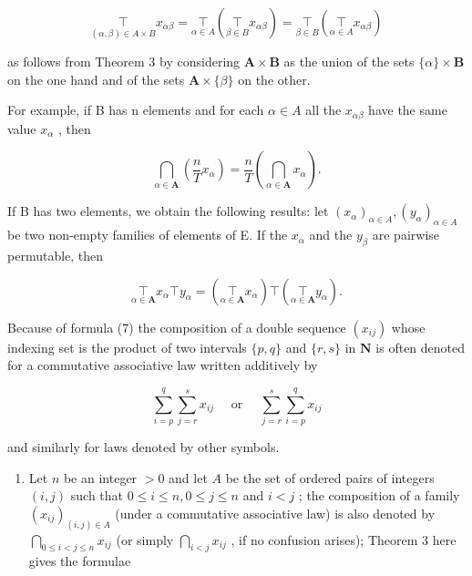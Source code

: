 \[
\underset {(\alpha , \beta) \in A \times B} {\top} x _ {\alpha \beta} = \underset {\alpha \in A} {\top} \left(\underset {\beta \in B} {\top} x _ {\alpha \beta}\right) = \underset {\beta \in B} {\top} \left(\underset {\alpha \in A} {\top} x _ {\alpha \beta}\right)\tag{7}
\]

as follows from Theorem 3 by considering \(\mathbf{A} \times \mathbf{B}\) as the union of the sets \(\{\alpha\} \times \mathbf{B}\) on the one hand and of the sets \(\mathbf{A} \times \{\beta\}\) on the other.

For example, if B has n elements and for each \(\alpha \in A\) all the \(x_{\alpha\beta}\) have the same value \(x_{\alpha}\) , then

\[
\bigcap_ {\alpha \in \mathbf {A}} \left(\frac {n}{T} x _ {\alpha}\right) = \frac {n}{T} \left(\bigcap_ {\alpha \in \mathbf {A}} x _ {\alpha}\right).\tag{8}
\]

If B has two elements, we obtain the following results: let \((x_{\alpha})_{\alpha \in A}, (y_{\alpha})_{\alpha \in A}\) be two non-empty families of elements of E. If the \(x_{\alpha}\) and the \(y_{\beta}\) are pairwise permutable, then

\[
\underset {\alpha \in \mathbf {A}} {\top} x _ {\alpha} \top y _ {\alpha} = \left(\underset {\alpha \in \mathbf {A}} {\top} x _ {\alpha}\right) \top \left(\underset {\alpha \in \mathbf {A}} {\top} y _ {\alpha}\right).\tag{9}
\]

Because of formula (7) the composition of a double sequence \((x_{ij})\) whose indexing set is the product of two intervals \(\{p, q\}\) and \(\{r, s\}\) in \(\mathbf{N}\) is often denoted for a commutative associative law written additively by

\[
\sum_ {i = p} ^ {q} \sum_ {j = r} ^ {s} x _ {i j} \quad \text { or } \quad \sum_ {j = r} ^ {s} \sum_ {i = p} ^ {q} x _ {i j}
\]

and similarly for laws denoted by other symbols.

\begin{enumerate}
\def\labelenumi{\arabic{enumi}.}
\setcounter{enumi}{1}
\tightlist
\item
  Let \(n\) be an integer \(>0\) and let \(A\) be the set of ordered pairs of integers \((i,j)\) such that \(0 \leqslant i \leqslant n, 0 \leqslant j \leqslant n\) and \(i < j\) ; the composition of a family \((x_{ij})_{(i,j) \in A}\) (under a commutative associative law) is also denoted by \(\bigcap_{0 \leqslant i < j \leqslant n} x_{ij}\) (or simply \(\bigcap_{i < j} x_{ij}\) , if no confusion arises); Theorem 3 here gives the formulae
\end{enumerate}


